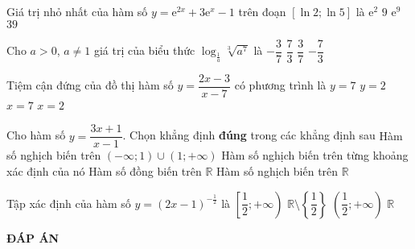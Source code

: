 \begin{ex}%
Giá trị nhỏ nhất của hàm số $y=\mathrm{e}^{2x}+3\mathrm{e}^x-1$ trên đoạn $[\ln 2;\ln 5]$ là
\choice
{$\mathrm{e}^2$}
{$9$}
{$\mathrm{e}^9$}
{\True $39$}
\end{ex}

\begin{ex}%
Cho $a>0$, $a\neq 1$ giá trị của biểu thức $\log_{\frac{1}{a}}\sqrt[3]{a^7}$ là
\choice
{$-\dfrac{3}{7}$}
{$\dfrac{7}{3}$}
{$\dfrac{3}{7}$}
{\True $-\dfrac{7}{3}$}
\end{ex}

\begin{ex}%
Tiệm cận đứng của đồ thị hàm số $y=\dfrac{2x-3}{x-7}$ có phương trình là
\choice
{$y=7$}
{$y=2$}
{\True $x=7$}
{$x=2$}
\end{ex}

\begin{ex}%
Cho hàm số $y=\dfrac{3x+1}{x-1}$. Chọn khẳng định \textbf{đúng} trong các khẳng định sau
\choice
{Hàm số nghịch biến trên $(-\infty;1)\cup (1;+\infty)$}
{\True  Hàm số nghịch biến trên từng khoảng xác định của nó}
{Hàm số đồng biến trên $\mathbb{R}$}
{Hàm số nghịch biến trên $\mathbb{R}$}
\end{ex}

\begin{ex}%
Tập xác định của hàm số $y=(2x-1)^{-\frac{1}{2}}$ là
\choice
{$\left[\dfrac{1}{2};+\infty\right)$}
{$\mathbb{R}\setminus\left\{\dfrac{1}{2}\right\}$}
{\True $\left(\dfrac{1}{2};+\infty\right)$}
{$\mathbb{R}$}
\end{ex}

\newpage
\begin{center}
	\textbf{ĐÁP ÁN}
\end{center}
\begin{multicols}{10}
	 
\end{multicols}